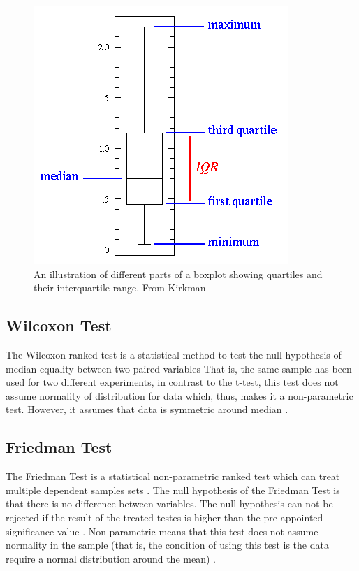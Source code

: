 \begin{figure}[!h]
	\centering
	\includegraphics[scale=0.5]{images/chapter3/boxplots.png}
	\caption{An illustration of different parts of a boxplot showing quartiles and their interquartile range. From Kirkman \cite{Kirkman1996}}
	\label{fig:boxplotIllus}
\end{figure}

\subsection{Wilcoxon Test}

The Wilcoxon ranked test is a statistical method to test the null hypothesis of median equality between two paired variables \cite{MCDONALD2008}That is, the same sample has been used for two different experiments, in contrast to the t-test, this test does not assume normality of distribution for data which, thus, makes it a non-parametric test. However, it assumes that data is symmetric around median \cite{MCDONALD2008}. 

\subsection{Friedman Test}

The Friedman Test is a statistical non-parametric ranked test which can treat multiple dependent samples sets \cite{Ross2010}. The null hypothesis of the Friedman Test is that there is no difference between variables. The null hypothesis can not be rejected if the result of the treated testes is higher than the pre-appointed significance value \cite{Friedman1940}. Non-parametric means that this test does not assume normality in the sample (that is, the condition of using this test is the data require a normal distribution around the mean) \cite{Ross2010}.

